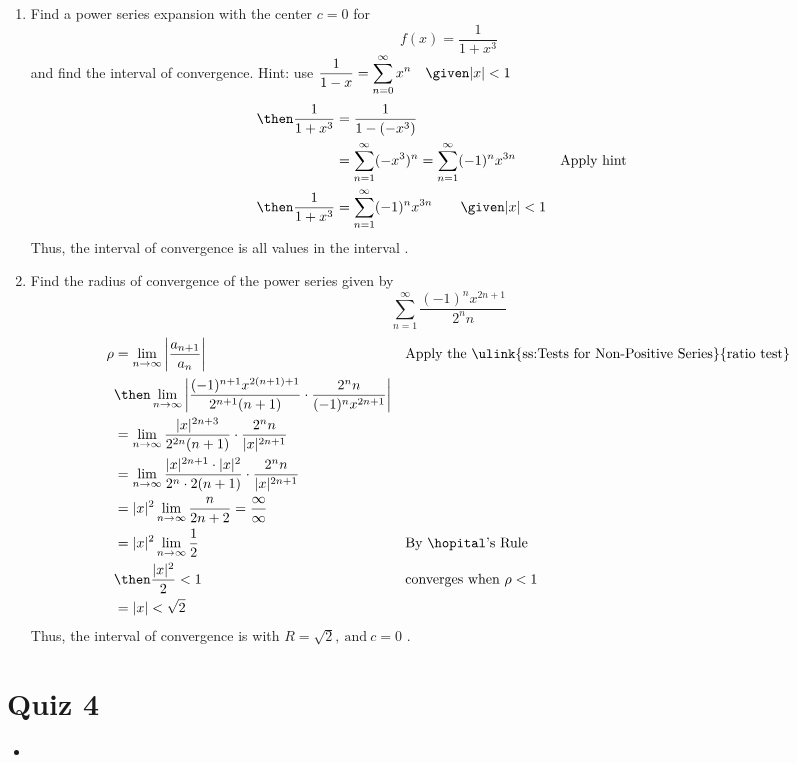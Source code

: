 \begin{enumerate}
\newpage %

  \item Find a power series expansion with the center \(c = 0 \) for
     \[%
     f(x) = \frac{1}{1+x^3}
     \]%
     and find the interval of convergence. Hint: use \(\displaystyle \frac{1}{1-x} = \sum_{n=0}^{\infty} x^n \quad \given |x| < 1 \)
     \begin{align*}
       \then \frac{1}{1+x^3} &= \frac{1}{1 - (-x^3)} \\
       &= \sum_{n=1}^{\infty} (-x^3)^n = \sum_{n=1}^{\infty} (-1)^nx^{3n}
       && \text{Apply hint} \\
       \then \frac{1}{1+x^3} &= \sum_{n=1}^{\infty} (-1)^n x^{3n} \qquad \given |x| < 1
     \end{align*}
     Thus, the interval of convergence is all values in the interval
     .

  \vspace{6em}

  \item Find the radius of convergence of the power series given by
    \[%
    \sum_{n=1}^{\infty} \frac{(-1)^n x^{2n+1} }{2^n n}
    \]%
    \begin{align*}
      \rho &= \lim_{n \to \infty} \left| \frac{a_{n+1}}{a_n}  \right|
           && \text{Apply the \ulink{ss:Tests for Non-Positive Series}{ratio test}} \\
           &\then \lim_{n \to \infty}
           \left| \frac{(-1)^{n+1} x^{2(n+1)+1}}{2^{n+1}(n+1)}
           \cdot \frac{2^n n}{(-1)^n x^{2n+1} }
           \right| \\
           &= \lim_{n \to \infty} \frac{|x|^{2n+3}}{2^{2n}(n+1)}
           \cdot \frac{2^n n}{|x|^{2n+1} } \\
           &= \lim_{n \to \infty} \frac{|x|^{2n+1} \cdot |x|^2}{2^n \cdot 2(n+1)}
           \cdot \frac{2^n n}{|x|^{2n+1} } \\
           &= |x|^2 \lim_{n \to \infty} \frac{n}{2n+2} = \frac{\infty}{\infty}\\
           &= |x|^2 \lim_{n \to \infty} \frac{1}{2}
           && \text{By \hopital's Rule} \\
           &\then \frac{|x|^2}{2} < 1
           && \text{converges when}~\rho < 1 \\
           &= |x| < \sqrt{2}
    \end{align*}
    Thus, the interval of convergence is  with \(R = \sqrt{2}, ~\text{and}~c = 0\)
    .

\end{enumerate}

\section{Quiz 4}
\begin{itemize}
  \item
\end{itemize}
